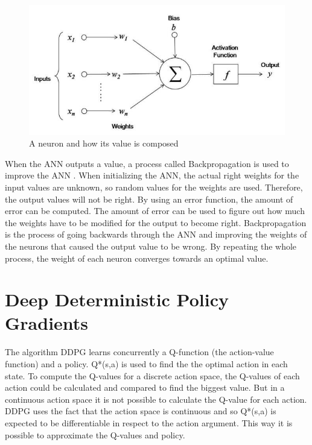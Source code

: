\begin{figure} [h]	
	\centering
	\includegraphics[width=1\textwidth]{figures/neuron.jpeg}
	\caption{A neuron and how its value is composed \cite{neuron.jpeg}}
	\label{neuron}
\end{figure}

\vspace{0.5cm}

When the ANN outputs a value, a process called Backpropagation is used to improve the ANN \cite{backprop}. When initializing the ANN, the actual right weights for the input values are unknown, so random values for the weights are used. Therefore, the output values will not be right. By using an error function, the amount of error can be computed. The amount of error can be used to figure out how much the weights have to be modified for the output to become right. Backpropagation is the process of going backwards through the ANN and improving the weights of the neurons that caused the output value to be wrong. By repeating the whole process, the weight of each neuron converges towards an optimal value. 

\vspace{0.5cm}

\section{Deep Deterministic Policy Gradients}

The algorithm DDPG learns concurrently a Q-function (the action-value function) and a policy. \cite{ddpg}
Q*(s,a) is used to find the the optimal action in each state.
To compute the Q-values for a discrete action space, the Q-values of each action could be calculated and compared to find the biggest value. But in a continuous action space it is not possible to calculate the Q-value for each action. DDPG uses the fact that the action space is continuous and so Q*(s,a) is expected to be differentiable in respect to the action argument. \cite{(ddpg)}
This way it is possible to approximate the Q-values and policy.

